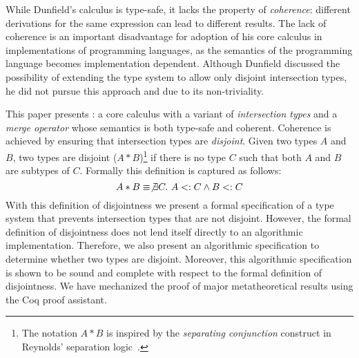 
While Dunfield's calculus is type-safe, it lacks the property of
\emph{coherence}: different derivations for the same expression can lead to
different results. The lack of coherence is an important disadvantage for
adoption of his core calculus in implementations of programming languages, as
the semantics of the programming language becomes implementation dependent.
Although Dunfield discussed the possibility of extending the type system to
allow only disjoint intersection types, he did not pursue this approach and
due to its non-triviality.


\begin{comment}
Moreover, from the theoretic point-of-view, the ambiguity that arises
from the lack of coherence makes the calculus unsatisfying when the
goal is to precisely capture the essence of solutions to
extensibility.
\end{comment}

This paper presents \name: a core calculus with a variant of \emph{intersection
types} and a \emph{merge operator} whose semantics \name is both type-safe and
coherent. Coherence is achieved by ensuring that intersection types are
\emph{disjoint}. Given two types $A$ and $B$, two types are disjoint ($A *
B$)\footnote{The notation $A * B$ is inspired by the \emph{separating
conjunction} construct in Reynolds' separation
logic~\cite{reynolds2002separation}.} if there is no type $C$ such that both $A$
and $B$ are subtypes of $C$. Formally this definition is captured as follows:
\[A * B \equiv \not\exists C.~A <: C \wedge B <: C\] With this definition of
disjointness we present a formal specification of a type system that prevents
intersection types that are not disjoint. However, the formal definition of
disjointness does not lend itself directly to an algorithmic implementation.
Therefore, we also present an algorithmic specification to determine whether two
types are disjoint. Moreover, this algorithmic specification is shown to be
sound and complete with respect to the formal definition of disjointness. We
have mechanized the proof of major metatheoretical results using the Coq proof
assistant. 


